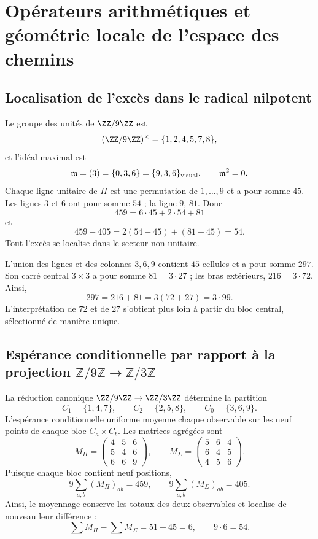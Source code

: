 \fi

\ifdefined\HMTAPPDevelopments
\chapter{Opérateurs arithmétiques et géométrie locale de l'espace des chemins}
\label{chap:app-operadores}

\section{Localisation de l'excès dans le radical nilpotent}

Le groupe des unités de \(\ZZ/9\ZZ\) est
\[
(\ZZ/9\ZZ)^\times=\{1,2,4,5,7,8\},
\]
et l'idéal maximal est
\[
\mathfrak m=(3)=\{0,3,6\}=\{9,3,6\}_{\rm visual},
\qquad\mathfrak m^2=0.
\]
Chaque ligne unitaire de \(\Pi\) est une permutation de \(1,\ldots,9\) et a pour somme
\(45\). Les lignes \(3\) et \(6\) ont pour somme \(54\) ; la ligne \(9\), \(81\).
Donc
\[
459=6\cdot45+2\cdot54+81
\]
et
\[
459-405=2(54-45)+(81-45)=54.
\]
Tout l'excès se localise dans le secteur non unitaire.

L'union des lignes et des colonnes \(3,6,9\) contient \(45\) cellules et a pour somme
\(297\). Son carré central \(3\times3\) a pour somme \(81=3\cdot27\) ; les bras
extérieurs, \(216=3\cdot72\). Ainsi,
\[
297=216+81=3(72+27)=3\cdot99.
\]
L'interprétation de \(72\) et de \(27\) s'obtient plus loin à partir du
bloc central, sélectionné de manière unique.

\section{Espérance conditionnelle par rapport à la projection \(\mathbb Z/9\mathbb Z\to\mathbb Z/3\mathbb Z\)}

La réduction canonique
\(\ZZ/9\ZZ\to\ZZ/3\ZZ\) détermine la partition
\[
 C_1=\{1,4,7\},\qquad
 C_2=\{2,5,8\},\qquad
 C_0=\{3,6,9\}.
\]
L'espérance conditionnelle uniforme moyenne chaque observable sur les neuf points de chaque bloc
\(C_a\times C_b\). Les matrices agrégées sont
\[
 M_{\Pi}=
 \begin{pmatrix}4&5&6\\5&4&6\\6&6&9\end{pmatrix},
 \qquad
 M_{\Sigma}=
 \begin{pmatrix}5&6&4\\6&4&5\\4&5&6\end{pmatrix}.
\]
Puisque chaque bloc contient neuf positions,
\[
 9\sum_{a,b}(M_\Pi)_{ab}=459,\qquad
 9\sum_{a,b}(M_\Sigma)_{ab}=405.
\]
Ainsi, le moyennage conserve les totaux des deux observables et localise de
nouveau leur différence :
\[
 \sum M_\Pi-\sum M_\Sigma=51-45=6,\qquad 9\cdot6=54.
\]

